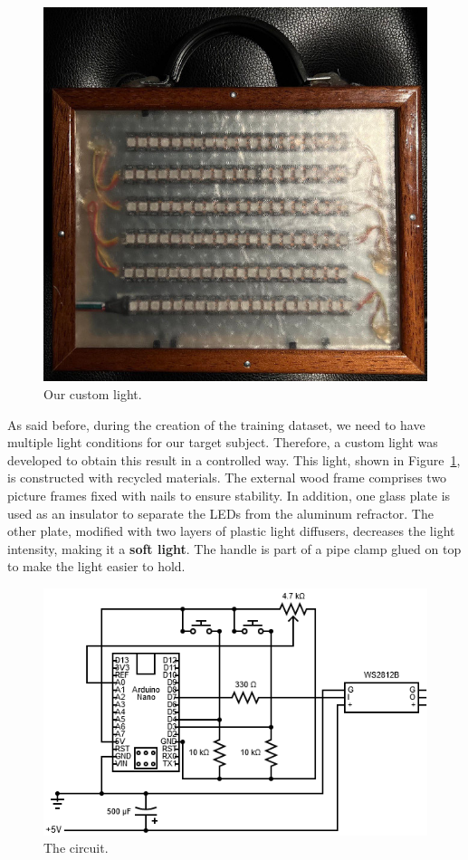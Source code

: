 \documentclass[preprint]{elsarticle}
\begin{document}
\begin{figure}[t]
	\centering
	\includegraphics[scale=0.25, keepaspectratio]{img/project_img/light.jpeg}
	\caption{Our custom light.}
	\label{fig:light}
\end{figure}

As said before, during the creation of the training dataset, we need to have multiple 
light conditions for our target subject. 
Therefore, a custom light was developed to obtain this result in a controlled way. This light, shown in Figure~\ref{fig:light}, is constructed with recycled materials. The external wood frame comprises two picture frames fixed with nails to ensure stability.  In addition, one glass plate is used as an insulator to separate the LEDs from the aluminum refractor. The other plate, modified with two layers of plastic light diffusers,  decreases the light intensity, making it a \textbf{soft light}.
The handle is part of a pipe clamp glued on top to make the light easier to hold.

\begin{figure}[H]
	\centering
	\includegraphics[scale=0.55, keepaspectratio]{img/project_img/circuit-light.png}
	\caption{The circuit.}
	\label{fig:light-circuit}
\end{figure}
\end{document}
